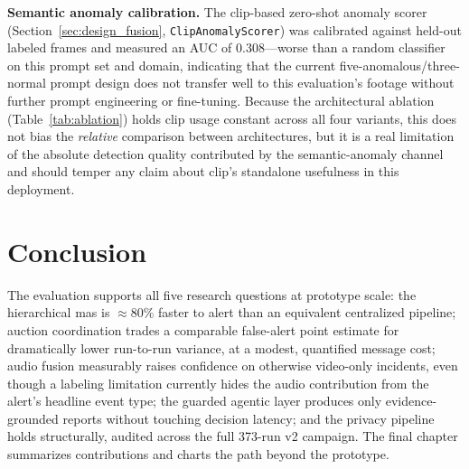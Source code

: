 \textbf{Semantic anomaly calibration.} The \gls{clip}-based zero-shot anomaly scorer (Section~\ref{sec:design_fusion}, \texttt{ClipAnomalyScorer}) was calibrated against held-out labeled frames and measured an AUC of 0.308---worse than a random classifier on this prompt set and domain, indicating that the current five-anomalous/three-normal prompt design does not transfer well to this evaluation's footage without further prompt engineering or fine-tuning. Because the architectural ablation (Table~\ref{tab:ablation}) holds \gls{clip} usage constant across all four variants, this does not bias the \emph{relative} comparison between architectures, but it is a real limitation of the absolute detection quality contributed by the semantic-anomaly channel and should temper any claim about \gls{clip}'s standalone usefulness in this deployment.

\section{Conclusion}

The evaluation supports all five research questions at prototype scale: the hierarchical \gls{mas} is $\approx$80\% faster to alert than an equivalent centralized pipeline; auction coordination trades a comparable false-alert point estimate for dramatically lower run-to-run variance, at a modest, quantified message cost; audio fusion measurably raises confidence on otherwise video-only incidents, even though a labeling limitation currently hides the audio contribution from the alert's headline event type; the guarded agentic layer produces only evidence-grounded reports without touching decision latency; and the privacy pipeline holds structurally, audited across the full 373-run v2 campaign. The final chapter summarizes contributions and charts the path beyond the prototype.
